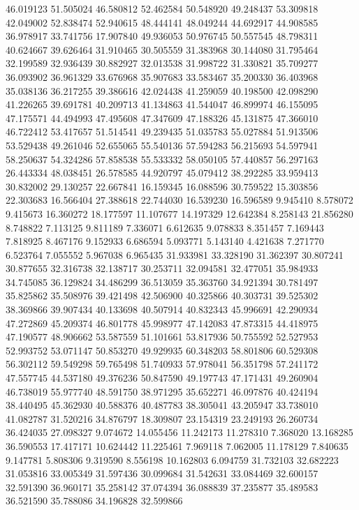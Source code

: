 46.019123
51.505024
46.580812
52.462584
50.548920
49.248437
53.309818
42.049002
52.838474
52.940615
48.444141
48.049244
44.692917
44.908585
36.978917
33.741756
17.907840
49.936053
50.976745
50.557545
48.798311
40.624667
39.626464
31.910465
30.505559
31.383968
30.144080
31.795464
32.199589
32.936439
30.882927
32.013538
31.998722
31.330821
35.709277
36.093902
36.961329
33.676968
35.907683
33.583467
35.200330
36.403968
35.038136
36.217255
39.386616
42.024438
41.259059
40.198500
42.098290
41.226265
39.691781
40.209713
41.134863
41.544047
46.899974
46.155095
47.175571
44.494993
47.495608
47.347609
47.188326
45.131875
47.366010
46.722412
53.417657
51.514541
49.239435
51.035783
55.027884
51.913506
53.529438
49.261046
52.655065
55.540136
57.594283
56.215693
54.597941
58.250637
54.324286
57.858538
55.533332
58.050105
57.440857
56.297163
26.443334
48.038451
26.578585
44.920797
45.079412
38.292285
33.959413
30.832002
29.130257
22.667841
16.159345
16.088596
30.759522
15.303856
22.303683
16.566404
27.388618
22.744030
16.539230
16.596589
9.945410
8.578072
9.415673
16.360272
18.177597
11.107677
14.197329
12.642384
8.258143
21.856280
8.748822
7.113125
9.811189
7.336071
6.612635
9.078833
8.351457
7.169443
7.818925
8.467176
9.152933
6.686594
5.093771
5.143140
4.421638
7.271770
6.523764
7.055552
5.967038
6.965435
31.933981
33.328190
31.362397
30.807241
30.877655
32.316738
32.138717
30.253711
32.094581
32.477051
35.984933
34.745085
36.129824
34.486299
36.513059
35.363760
34.921394
30.781497
35.825862
35.508976
39.421498
42.506900
40.325866
40.303731
39.525302
38.369866
39.907434
40.133698
40.507914
40.832343
45.996691
42.290934
47.272869
45.209374
46.801778
45.998977
47.142083
47.873315
44.418975
47.190577
48.906662
53.587559
51.101661
53.817936
50.755592
52.527953
52.993752
53.071147
50.853270
49.929935
60.348203
58.801806
60.529308
56.302112
59.549298
59.765498
51.740933
57.978041
56.351798
57.241172
47.557745
44.537180
49.376236
50.847590
49.197743
47.171431
49.260904
46.738019
55.977740
48.591750
38.971295
35.652271
46.097876
40.424194
38.440495
45.362930
40.588376
40.487783
38.305041
43.205947
33.738010
41.082787
31.520216
34.876797
18.309807
23.154319
23.249193
26.260734
36.424035
27.098327
9.074672
14.055456
11.242173
11.278310
7.368020
13.168285
36.590553
17.417171
10.624442
11.225461
7.969118
7.062005
11.178129
7.840635
9.147781
5.808306
9.319590
8.556198
10.162803
6.094759
31.732103
32.682223
31.053816
33.005349
31.597436
30.099684
31.542631
33.084469
32.600157
32.591390
36.960171
35.258142
37.074394
36.088839
37.235877
35.489583
36.521590
35.788086
34.196828
32.599866
